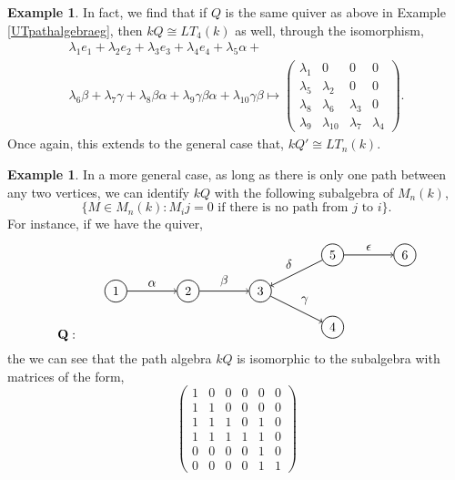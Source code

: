 \documentclass[11.5pt, twoside, a4paper, titlepage]{report}
\theoremstyle{definition}
\newtheorem{eg}[mydef]{Example}
\theoremstyle{plain}
\begin{document}
\begin{eg}
In fact, we find that if $Q$ is the same quiver as above in Example \ref{UTpathalgebraeg}, then $kQ \cong LT_4(k)$ as well, through the isomorphism,
\begin{multline*}
\lambda_1e_1+\lambda_2e_2+\lambda_3e_3+\lambda_4e_4+\lambda_5\alpha+\\
\lambda_6\beta+\lambda_7\gamma+\lambda_8\beta\alpha+\lambda_9\gamma\beta\alpha+\lambda_{10}\gamma\beta
\mapsto
\begin{pmatrix*}
\lambda_1 & 0 & 0 & 0\\
\lambda_5 & \lambda_2 & 0 & 0\\
\lambda_8 & \lambda_6 & \lambda_3 & 0\\
\lambda_9 & \lambda_{10} & \lambda_7 & \lambda_4
\end{pmatrix*}.
\end{multline*}
Once again, this extends to the general case that, $kQ' \cong LT_n(k)$.
\end{eg}

\begin{eg} \label{pathalgebramatrixeg}
In a more general case, as long as there is only one path between any two vertices, we can identify $kQ$ with the following subalgebra of $M_n(k)$,
\begin{equation*}
\{M \in M_n(k): M_ij=0 \text{ if there is no path from } j \text{ to }i\}.
\end{equation*}
For instance, if we have the quiver,
\begin{equation*}
\mathbf{Q}: \qquad
\begin{tikzpicture}[->,-latex, auto, every path/.style={->, semithick}, main node/.style={draw, circle}]
\node	[main node]		(1) at (0,0)		{1};
\node [main node]		(2) at (2,0)		{2};
\node [main node]		(3) at (4,0)		{3};
\node [main node]		(4) at (6,-1)		{4};
\node [main node]		(5) at (6,1)		{5};
\node [main node]		(6) at (8, 1)		{6};

\draw (1) edge node [auto] {$\alpha$} (2);
\draw (2) edge node [auto] {$\beta$} (3);
\draw (3) edge node [auto] {$\gamma$} (4);
\draw (5) edge node [auto, swap] {$\delta$} (3);
\draw (5) edge node [auto] {$\epsilon$} (6);
\end{tikzpicture}
\end{equation*}
the we can see that the path algebra $kQ$ is isomorphic to the subalgebra with matrices of the form,
\begin{equation*}
\begin{pmatrix*}
1 & 0 & 0 & 0 & 0 & 0 \\
1 & 1 & 0 & 0 & 0 & 0 \\
1 & 1 & 1 & 0 & 1 & 0 \\
1 & 1 & 1 & 1 & 1 & 0 \\
0 & 0 & 0 & 0 & 1 & 0 \\
0 & 0 & 0 & 0 & 1 & 1
\end{pmatrix*}
\end{equation*}
\end{eg}
\end{document}
